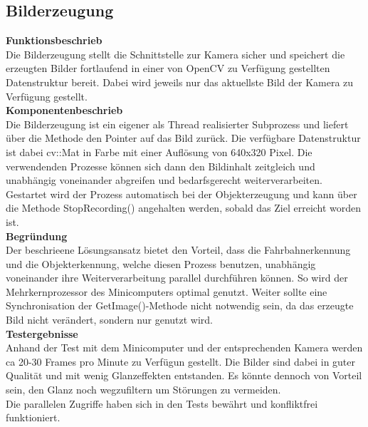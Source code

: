 \subsection{Bilderzeugung}

\textbf{Funktionsbeschrieb}\\[0.2cm]
Die Bilderzeugung stellt die Schnittstelle zur Kamera sicher und speichert die erzeugten Bilder fortlaufend in einer von OpenCV zu Verfügung gestellten Datenstruktur bereit. Dabei wird jeweils nur das aktuellste Bild der Kamera zu Verfügung gestellt.\\[0.2cm]
\textbf{Komponentenbeschrieb}\\[0.2cm]
Die Bilderzeugung ist ein eigener als Thread realisierter Subprozess und liefert über die Methode  den Pointer auf das Bild zurück. Die verfügbare Datenstruktur ist dabei cv::Mat in Farbe mit einer Auflösung von 640x320 Pixel. Die verwendenden Prozesse können sich dann den Bildinhalt zeitgleich und unabhängig voneinander abgreifen und bedarfsgerecht weiterverarbeiten. Gestartet wird der Prozess automatisch bei der Objekterzeugung und kann über die Methode StopRecording() angehalten werden, sobald das Ziel erreicht worden ist.\\[0.2cm]
\textbf{Begründung}\\[0.2cm]
Der beschrieene Lösungsansatz bietet den Vorteil, dass die Fahrbahnerkennung und die Objekterkennung, welche diesen Prozess benutzen, unabhängig voneinander ihre Weiterverarbeitung parallel durchführen können. So wird der Mehrkernprozessor des Minicomputers optimal genutzt. Weiter  sollte eine Synchronisation der GetImage()-Methode nicht notwendig sein, da das erzeugte Bild nicht verändert, sondern nur genutzt wird.\\[0.2cm]
\textbf{Testergebnisse}\\[0.2cm]
Anhand der Test mit dem Minicomputer und der entsprechenden Kamera werden ca 20-30 Frames pro Minute zu Verfügun gestellt. Die Bilder sind dabei in guter Qualität und mit wenig Glanzeffekten entstanden. Es könnte dennoch von Vorteil sein, den Glanz noch wegzufiltern um Störungen zu vermeiden.\\
Die parallelen Zugriffe haben sich in den Tests bewährt und konfliktfrei funktioniert.